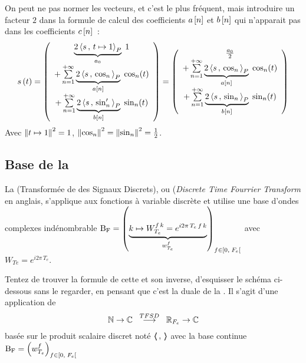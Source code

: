 \begin{exercice}
On peut ne pas normer les vecteurs, et c'est le plus fréquent, mais introduire un facteur $2$ dans la formule de calcul des coefficients $a\left[n\right]$ et $b\left[n\right]$ qui n'apparait pas dans les coefficients $c\left[n\right]$~:
  \begin{equation}
    \label{eq:sdf_non_normee}
    s\left(t\right) = \left(
    \begin{array}{c}
      {\underbrace{2\,\langle s\,,\,t\mapsto 1{\rangle}_P}_{a_0}\;1} \\
      + \sum\limits_{n=1}^{+\infty}{\underbrace{2\,\langle s\,,\,\cos_n{\rangle}_P}_{a\left[n\right]}\;\cos_n(t)}  \\
      + \sum\limits_{n=1}^{+\infty}{\underbrace{2\,\langle s\,,\,\sin_n'{\rangle}_P}_{b\left[n\right]}\;\sin_n(t)}     
    \end{array}\right)
  = \left(
    \begin{array}{c}
      \frac{a_0}{2}  \\
      + \sum\limits_{n=1}^{+\infty}{\underbrace{2\,\langle s\,,\,\cos_n{\rangle}_P}_{a\left[n\right]}\;\cos_n(t)}  \\
      + \sum\limits_{n=1}^{+\infty}{\underbrace{2\,\langle s\,,\,\sin_n{\rangle}_P}_{b\left[n\right]}\;\sin_n(t)}
    \end{array}\right)
\end{equation}
Avec $\left\|t\mapsto 1\right\|^2=1$, $\left\|\cos_n\right\|^2=\left\|\sin_n\right\|^2= \frac{1}{2}$.

\end{exercice}


\subsection{Base de la \TFSD{}}

La \TFSD{} (Transformée de \Fourier{} des Signaux Discrets), ou \DTFT{} (\emph{Discrete Time Fourrier Transform} en anglais, s'applique aux fonctions à variable discrète et utilise une base d'ondes complexes indénombrable $\mathrm{B_F}=\left(\underbrace{k\mapsto W_{T_e}^{f\,k}=e^{i 2 \pi\,T_e\,f\,k}}_{w_{T_e}^f}\right)_{f\in\left[0,\;F_e\right[{}}$ avec $W_{Te}=e^{i 2 \pi\,T_e}$.

\begin{exercice}
Tentez de trouver la formule de cette \TFSD{}  et son inverse, d'esquisser le schéma ci-dessous sans le regarder, en pensant que c'est la \og{}duale\fg{} de la \sdf{}. Il s'agit d'une application de $$\mathbb{N}\rightarrow\mathbb{C}\;\;\overset{TFSD}{\longrightarrow}\;\;\mathbb{R}_{F_e}\rightarrow\mathbb{C}$$ basée sur le produit scalaire discret noté $\langle\!\!\langle\,,\,\rangle\!\!\rangle$ avec la base continue $\mathrm{B_F}=\left(w_{T_e}^f\right)_{f\in\left[0,\;F_e\right[}$
\end{exercice}



